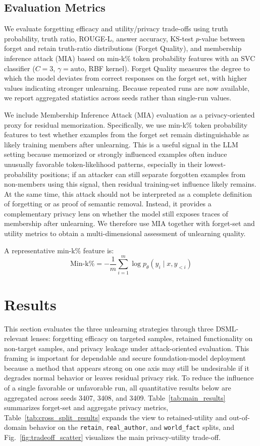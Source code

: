 \documentclass[conference]{IEEEtran}
\begin{document}
\subsection{Evaluation Metrics}
We evaluate forgetting efficacy and utility/privacy trade-offs using truth probability, truth ratio, ROUGE-L, answer accuracy, KS-test $p$-value between forget and retain truth-ratio distributions (Forget Quality), and membership inference attack (MIA) based on min-k\% token probability features with an SVC classifier ($C = 3$, $\gamma = \mathrm{auto}$, RBF kernel). Forget Quality measures the degree to which the model deviates from correct responses on the forget set, with higher values indicating stronger unlearning. Because repeated runs are now available, we report aggregated statistics across seeds rather than single-run values.

We include Membership Inference Attack (MIA) evaluation as a privacy-oriented proxy for residual memorization. Specifically, we use min-k\% token probability features to test whether examples from the forget set remain distinguishable as likely training members after unlearning. This is a useful signal in the LLM setting because memorized or strongly influenced examples often induce unusually favorable token-likelihood patterns, especially in their lowest-probability positions; if an attacker can still separate forgotten examples from non-members using this signal, then residual training-set influence likely remains. At the same time, this attack should not be interpreted as a complete definition of forgetting or as proof of semantic removal. Instead, it provides a complementary privacy lens on whether the model still exposes traces of membership after unlearning. We therefore use MIA together with forget-set and utility metrics to obtain a multi-dimensional assessment of unlearning quality.

A representative min-k\% feature is:
\begin{equation}
\mathrm{Min\mbox{-}k\%} = -\frac{1}{m}\sum_{i=1}^{m}\log p_{\theta}(y_i\mid x, y_{<i})
\end{equation}

\section{Results}
This section evaluates the three unlearning strategies through three DSML-relevant lenses: forgetting efficacy on targeted samples, retained functionality on non-target samples, and privacy leakage under attack-oriented evaluation. This framing is important for dependable and secure foundation-model deployment because a method that appears strong on one axis may still be undesirable if it degrades normal behavior or leaves residual privacy risk. To reduce the influence of a single favorable or unfavorable run, all quantitative results below are aggregated across seeds 3407, 3408, and 3409. Table~\ref{tab:main_results} summarizes forget-set and aggregate privacy metrics, Table~\ref{tab:cross_split_results} expands the view to retained-utility and out-of-domain behavior on the \texttt{retain}, \texttt{real\_author}, and \texttt{world\_fact} splits, and Fig.~\ref{fig:tradeoff_scatter} visualizes the main privacy-utility trade-off.
\end{document}
